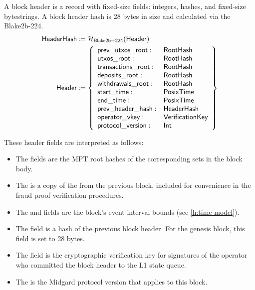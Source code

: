 \documentclass[../midgard.tex]{subfiles}
\begin{document}
A block header is a record with fixed-size fields: integers, hashes, and fixed-size bytestrings.
A block header hash is 28 bytes in size and calculated via the Blake2b-224.
\begin{equation*}
\begin{split}
  \mathsf{HeaderHash} &\coloneq \mathcal{H}_{\mathsf{Blake2b-224}}(\mathsf{Header}) \\
  \mathsf{Header} &\coloneq \left\{
    \begin{array}{ll}
        \mathsf{prev\_utxos\_root} : & \mathsf{RootHash} \\
        \mathsf{utxos\_root} : & \mathsf{RootHash} \\
        \mathsf{transactions\_root} : & \mathsf{RootHash} \\
        \mathsf{deposits\_root} : & \mathsf{RootHash} \\
        \mathsf{withdrawals\_root} : & \mathsf{RootHash} \\
        \mathsf{start\_time} : & \mathsf{PosixTime} \\
        \mathsf{end\_time} : & \mathsf{PosixTime} \\
        \mathsf{prev\_header\_hash} : & \mathsf{HeaderHash} \\
        \mathsf{operator\_vkey} : & \mathsf{VerificationKey} \\
        \mathsf{protocol\_version} : & \mathsf{Int} \\
    \end{array} \right\}
\end{split}
\end{equation*}

These header fields are interpreted as follows:
\begin{itemize}
    \item The  fields are the MPT root hashes of the corresponding sets in the block body.
    \item The  is a copy of the  from the previous block, included for convenience in the fraud proof verification procedures.
    \item The  and  fields are the block's event interval bounds (see \cref{h:time-model}).
    \item The  field is a hash of the previous block header. For the genesis block, this field is set to 28  bytes.
    \item The  field is the cryptographic verification key for signatures of the operator who committed the block header to the L1 state queue.
    \item The  is the Midgard protocol version that applies to this block.
\end{itemize}
\end{document}
